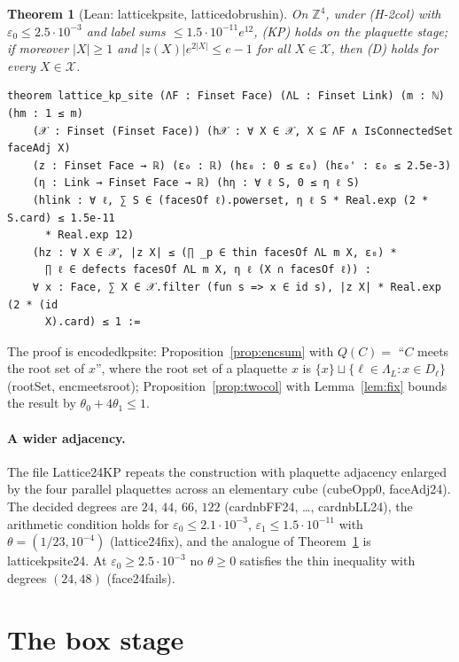 \documentclass[11pt,a4paper]{article}
\newtheorem{theorem}{Theorem}[section]
\theoremstyle{definition}
\theoremstyle{remark}
\DeclareRobustCommand{\lean}[1]{{\ttfamily\renewcommand{\_}{\textunderscore\allowbreak}#1}}
\newenvironment{leanquote}{\par\smallskip\footnotesize}{\par\smallskip}
\newcommand{\Z}{\mathbb{Z}}
\begin{document}
\begin{theorem}[Lean: \lean{lattice\_kp\_site}, \lean{lattice\_dobrushin}]\label{thm:face}
On $\Z^4$, under (H-2col) with $\varepsilon_0\le2.5\cdot10^{-3}$ and label sums $\le1.5\cdot10^{-11}e^{12}$, (KP) holds on the plaquette stage; if moreover $|X|\ge1$ and $|z(X)|e^{2|X|}\le e-1$ for all $X\in\mathcal X$, then (D) holds for every $X\in\mathcal X$.
\end{theorem}
\begin{leanquote}
\begin{verbatim}
theorem lattice_kp_site (ΛF : Finset Face) (ΛL : Finset Link) (m : ℕ) (hm : 1 ≤ m)
    (𝒳 : Finset (Finset Face)) (h𝒳 : ∀ X ∈ 𝒳, X ⊆ ΛF ∧ IsConnectedSet faceAdj X)
    (z : Finset Face → ℝ) (ε₀ : ℝ) (hε₀ : 0 ≤ ε₀) (hε₀' : ε₀ ≤ 2.5e-3)
    (η : Link → Finset Face → ℝ) (hη : ∀ ℓ S, 0 ≤ η ℓ S)
    (hlink : ∀ ℓ, ∑ S ∈ (facesOf ℓ).powerset, η ℓ S * Real.exp (2 * S.card) ≤ 1.5e-11
      * Real.exp 12)
    (hz : ∀ X ∈ 𝒳, |z X| ≤ (∏ _p ∈ thin facesOf ΛL m X, ε₀) *
      ∏ ℓ ∈ defects facesOf ΛL m X, η ℓ (X ∩ facesOf ℓ)) :
    ∀ x : Face, ∑ X ∈ 𝒳.filter (fun s => x ∈ id s), |z X| * Real.exp (2 * (id
      X).card) ≤ 1 :=
\end{verbatim}
\end{leanquote}
The proof is \lean{encoded\_kp\_site}: Proposition~\ref{prop:encsum} with $Q(C)=$ ``$C$ meets the root set of $x$'', where the root set of a plaquette $x$ is $\{x\}\sqcup\{\ell\in\Lambda_L:x\in D_\ell\}$ (\lean{rootSet}, \lean{enc\_meets\_root}); Proposition~\ref{prop:twocol} with Lemma~\ref{lem:fix} bounds the result by $\theta_0+4\theta_1\le1$.

\paragraph{A wider adjacency.} The file \lean{Lattice24KP} repeats the construction with plaquette adjacency enlarged by the four parallel plaquettes across an elementary cube (\lean{cubeOpp0}, \lean{faceAdj24}). The decided degrees are $24$, $44$, $66$, $122$ (\lean{card\_nbFF24\_0}, \dots, \lean{card\_nbLL24\_0}), the arithmetic condition holds for $\varepsilon_0\le2.1\cdot10^{-3}$, $\varepsilon_1\le1.5\cdot10^{-11}$ with $\theta=(1/23,10^{-4})$ (\lean{lattice24\_fix}), and the analogue of Theorem~\ref{thm:face} is \lean{lattice\_kp\_site24}. At $\varepsilon_0\ge2.5\cdot10^{-3}$ no $\theta\ge0$ satisfies the thin inequality with degrees $(24,48)$ (\lean{face24\_fails}).

\section{The box stage}\label{sec:box}
\end{document}
